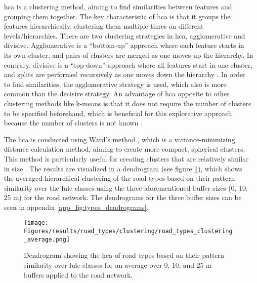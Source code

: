 \gls{hca} is a clustering method, aiming to find similarities between features and grouping them together. The key characteristic of \gls{hca} is that it groups the features hierarchically, clustering them multiple times on different levels/hierarchies. There are two clustering strategies in \gls{hca}, agglomerative and divisive. Agglomerative is a \enquote{bottom-up} approach where each feature starts in its own cluster, and pairs of clusters are merged as one moves up the hierarchy. In contrary, divisive is a \enquote{top-down} approach where all features start in one cluster, and splits are performed recursively as one moves down the hierarchy \autocite{Johnson1967,Murtagh.Legendre2014}. In order to find similarities, the agglomerative strategy is used, which also is more common than the decisive strategy. An advantage of \gls{hca} opposite to other clustering methods like k-means is that it does not require the number of clusters to be specified beforehand, which is beneficial for this explorative approach because the number of clusters is not known \autocite{Johnson1967}.

The \gls{hca} is conducted using Ward's method \autocite{Ward1963}, which is a variance-minimizing distance calculation method, aiming to create more compact, spherical clusters. This method is particularly useful for creating clusters that are relatively similar in size \autocite{Murtagh.Legendre2014}. The results are visualized in a dendrogram (see figure \ref{fig:types_dendrogram_mean}), which shows the averaged hierarchical clustering of the road types based on their pattern similarity over the \gls{lulc} classes using the three aforementioned buffer sizes (0, 10, 25 m) for the road network. The dendrograms for the three buffer sizes can be seen in appendix \ref{app_fig:types_dendrograms}.

\begin{figure}[htb]
    \centering
    \texttt{[image: Figures/results/road\_types/clustering/road\_types\_clustering\_average.png]}
    \caption[Averaged Dendrogram of  of Road Types]{Dendrogram showing the \gls{hca} of road types based on their pattern similarity over \gls{lulc} classes for an average over 0, 10, and 25 m buffers applied to the road network.}
    \label{fig:types_dendrogram_mean}
\end{figure}

